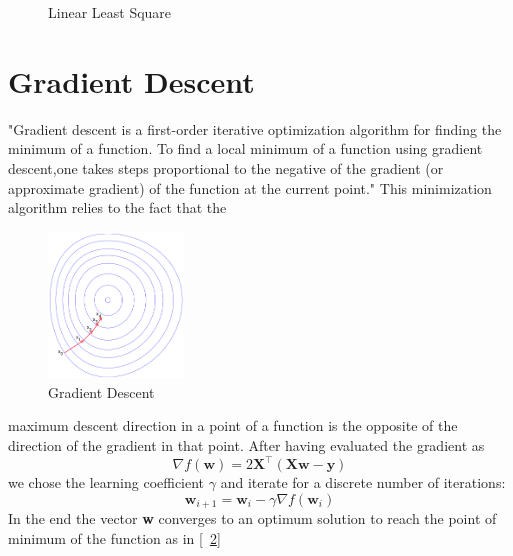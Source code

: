 \documentclass[12pt]{report}
\begin{document}
\begin{figure}[H]
\begin{center}
\caption{Linear Least Square}
\label{fig:lls}
\end{center}
\end{figure}






\section{Gradient Descent}\label{gr}
"Gradient descent is a first-order iterative optimization algorithm for finding the minimum of a function. To find a local minimum of a function using gradient descent,one takes steps proportional
 to the negative of the gradient (or approximate gradient) of the function at the current point."\cite{GD}
 This minimization algorithm relies to the fact that the
\begin{figure}
  \vspace{-20pt}
  \begin{center}
    \includegraphics[width=0.32\textwidth]{GD.png}
    \caption{Gradient Descent \cite{GD}}
    \label{fig:graddesc}
  \end{center}
  \vspace{-10pt}
  \vspace{-10pt}
\end{figure}
maximum descent direction in a point of a function is the opposite of the direction of the gradient in that point.
After having evaluated the gradient as
 \begin{equation}
  \nabla f ( \mathbf { w } ) = 2 \mathbf { X } ^ { \top } ( \mathbf { X w } - \mathbf { y } )
\end{equation}
we chose the learning coefficient $\gamma$ and iterate for a discrete number of iterations:
\begin{equation}\label{2.4}
\mathbf { w } _ { i + 1 } = \mathbf { w } _ { i } - \gamma \nabla f \left( \mathbf { w } _ { i } \right)
\end{equation}
In the end the vector \textbf{w} converges to an optimum solution to reach the point of minimum of the function as in [\figurename~\ref{fig:graddesc}]
\end{document}
